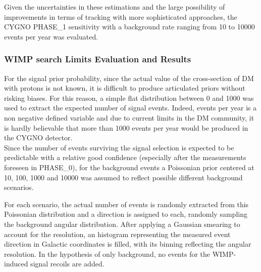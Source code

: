 \documentclass[physics,article,submit,moreauthors,pdftex]{Definitions/mdpi}
\begin{document}
Given the uncertainties in these estimations and the large possibility of improvements in terms of tracking with more sophisticated approaches, the CYGNO PHASE\_1 sensitivity with a background rate ranging from 10 to 10000 events per year was evaluated. 



\subsubsection{WIMP search Limits Evaluation and Results} \label{sec:bayes}

For the signal prior probability, since the actual value of the cross-section of DM with protons is not known, it is difficult to produce articulated priors without risking biases. For this reason, a simple flat distribution between 0 and 1000 was used to extract the expected number of signal events. Indeed, events per year is a non negative defined variable and due to current limits in the DM community, it is hardly believable that more than 1000 events per year would be produced in the CYGNO detector.\\
Since the number of events surviving the signal selection is expected to be predictable with a relative good confidence (especially after the measurements foreseen in PHASE\_0), for the  background events  a Poissonian prior centered at 10, 100, 1000 and 10000 was assumed to reflect possible different background scenarios.

For each scenario, the actual number of events is randomly extracted from this Poissonian distribution and a direction is assigned to each, randomly sampling the background angular distribution. After applying a Gaussian smearing to account for the resolution, an histogram representing the measured event direction in Galactic coordinates is filled, with its binning reflecting the angular resolution. In the hypothesis of only background, no events for the WIMP-induced signal recoils are added.\\
\end{document}
